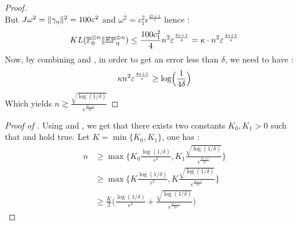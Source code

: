\begin{proof}
\begin{equation*}
\end{equation*}
But $J\omega^2= \normp[2]{\gamma_\eta} = 100\epsilon^2$ and $\omega^2 = c_1^2 \epsilon^{\frac{2s+1}{s}}$ hence : 
\begin{equation*}
    KL(\P_0^{\otimes n}\Vert \E\P_\eta^{\otimes n}) \leq \frac{100c_1^2}{4}n^2 \epsilon^{\frac{4s+1}{s}} = \kappa \cdot n^2 \epsilon^{\frac{4s+1}{s}}
\end{equation*}
Now, by combining  and , in order to get an error less than $\delta$, we need to have : 
\begin{equation*}
    \kappa n^2\epsilon^{\frac{4s+1}{s}} \geq \log\Bigl(\frac{1}{4\delta}\Bigr)
\end{equation*}
Which yields $n \gtrsim \frac{\sqrt{\log(1/\delta)}}{\epsilon^{\frac{4s+1}{2s}}}$
\end{proof}

\begin{proof}[Proof of ]
    Using  and , we get that there exists two constants $K_0,K_1 >0$ such that  and  hold true. 
    Let $K = \min \{K_0,K_1\}$, one has : 
    \begin{align*}
        n &\geq \max\Biggl\{K_0 \frac{\log(1/\delta)}{\epsilon^2},K_1 \frac{\sqrt{\log(1/\delta)}}{\epsilon^{\frac{4s+1}{2s}}}\Biggr\}\\ 
        &\geq \max\Biggl\{K \frac{\log(1/\delta)}{\epsilon^2},K \frac{\sqrt{\log(1/\delta)}}{\epsilon^{\frac{4s+1}{2s}}}\Biggr\}\\ 
        &\geq \frac{K}{2}\Biggl(\frac{\log(1/\delta)}{\epsilon^2}+\frac{\sqrt{\log(1/\delta)}}{\epsilon^{\frac{4s+1}{2s}}}\Biggr)
    \end{align*}

\end{proof}